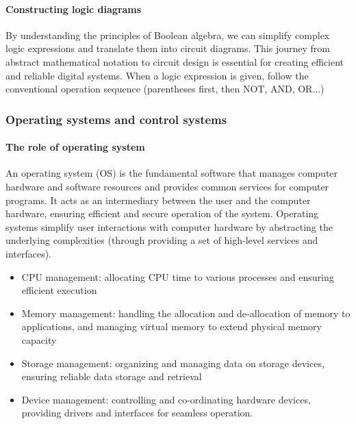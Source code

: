 \paragraph{Constructing logic diagrams}
By understanding the principles of Boolean algebra, we can simplify complex logic expressions and translate them into circuit diagrams. This journey from abstract mathematical notation 
to circuit design is essential for creating efficient and reliable digital systems. When a logic expression is given, follow the conventional operation sequence (parentheses first, then NOT, AND, OR...) 
\subsubsection{Operating systems and control systems}
\paragraph{The role of operating system}
An operating system (OS) is the fundamental software that manages computer hardware 
and software resources and provides common services for computer programs. It acts as an intermediary between the user and the computer hardware, ensuring efficient and secure operation of the system. Operating systems simplify user interactions with computer hardware by abstracting the underlying complexities (through providing a set of high-level services and interfaces).
\begin{itemize}
    \item CPU management: allocating CPU time to various processes and ensuring 
efficient execution 
	\item Memory management: handling the allocation and de-allocation of memory to 
applications, and managing virtual memory to extend physical memory capacity 
\item Storage management: organizing and managing data on storage devices, ensuring reliable data storage and retrieval 
\item Device management: controlling and co-ordinating hardware devices, providing drivers and interfaces for seamless operation. 
\end{itemize}
